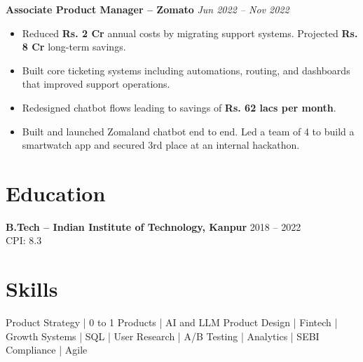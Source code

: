 \documentclass[10pt,a4paper]{article}
\begin{document}
\noindent\textbf{Associate Product Manager – Zomato} \hfill \textit{Jun 2022 – Nov 2022}
\vspace{-3pt}
\begin{itemize}
  \item Reduced \textbf{Rs. 2 Cr} annual costs by migrating support systems. Projected \textbf{Rs. 8 Cr} long-term savings.
  
  \item Built core ticketing systems including automations, routing, and dashboards that improved support operations.
  
  \item Redesigned chatbot flows leading to savings of \textbf{Rs. 62 lacs per month}.
  
  \item Built and launched Zomaland chatbot end to end. Led a team of 4 to build a smartwatch app and secured 3rd place at an internal hackathon.
\end{itemize}

\section*{Education}

\textbf{B.Tech – Indian Institute of Technology, Kanpur} \hfill 2018 – 2022 \\
CPI: 8.3

\section*{Skills}

Product Strategy | 0 to 1 Products | AI and LLM Product Design | Fintech | Growth Systems | SQL | User Research | A/B Testing | Analytics | SEBI Compliance | Agile
\end{document}
